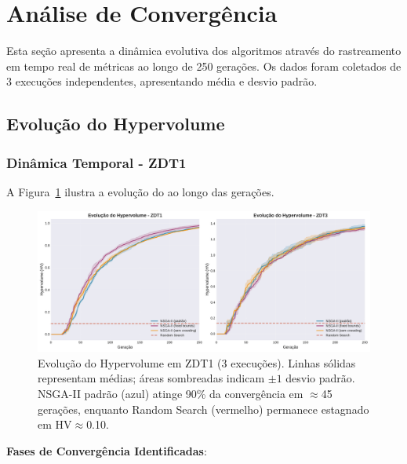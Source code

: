 
\section{Análise de Convergência}

Esta seção apresenta a dinâmica evolutiva dos algoritmos através do rastreamento em tempo real de métricas ao longo de 250 gerações. Os dados foram coletados de 3 execuções independentes, apresentando média e desvio padrão.

\subsection{Evolução do Hypervolume}

\subsubsection{Dinâmica Temporal - ZDT1}

A Figura~\ref{fig:hv_evolution} ilustra a evolução do \hlv{} ao longo das gerações.

\begin{figure}[H]
    \centering
    \includegraphics[width=\textwidth]{../plots/B_hypervolume_evolution_REAL.pdf}
    \caption{Evolução do Hypervolume em ZDT1 (3 execuções). Linhas sólidas representam médias; áreas sombreadas indicam $\pm 1$ desvio padrão. NSGA-II padrão (azul) atinge 90\% da convergência em $\approx$45 gerações, enquanto Random Search (vermelho) permanece estagnado em HV$\approx$0.10.}
    \label{fig:hv_evolution}
\end{figure}

\textbf{Fases de Convergência Identificadas}:

